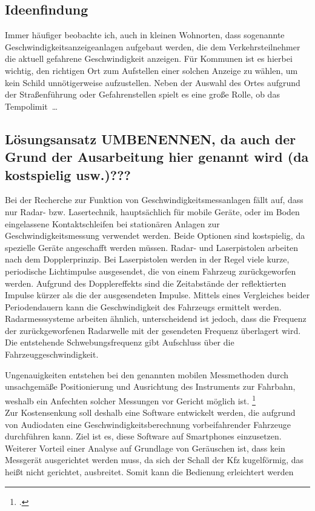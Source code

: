 \subsection{Ideenfindung}
Immer häufiger beobachte ich, auch in kleinen Wohnorten, dass sogenannte Geschwindigkeitsanzeigeanlagen aufgebaut werden, die dem Verkehrsteilnehmer die aktuell gefahrene Geschwindigkeit anzeigen.
Für Kommunen ist es hierbei wichtig, den richtigen Ort zum Aufstellen einer solchen Anzeige zu wählen, um kein Schild unnötigerweise aufzustellen. Neben der Auswahl des Ortes aufgrund der Straßenführung oder Gefahrenstellen spielt es eine große Rolle, ob das Tempolimit \dots

\subsection{Lösungsansatz \textbf{UMBENENNEN, da auch der Grund der Ausarbeitung hier genannt wird (da kostspielig usw.)???}} %
Bei der Recherche zur Funktion von Geschwindigkeitsmessanlagen fällt auf, dass nur Radar- bzw. Lasertechnik, hauptsächlich für mobile Geräte, oder im Boden eingelassene Kontaktschleifen bei stationären Anlagen zur Geschwindigkeitsmessung verwendet werden. Beide Optionen sind kostspielig, da spezielle Geräte angeschafft werden müssen. Radar- und Laserpistolen arbeiten nach dem Dopplerprinzip. Bei Laserpistolen werden in der Regel viele kurze, periodische Lichtimpulse ausgesendet, die von einem Fahrzeug zurückgeworfen werden. Aufgrund des Dopplereffekts sind die Zeitabstände der reflektierten Impulse kürzer als die der ausgesendeten Impulse. Mittels eines Vergleiches beider Periodendauern kann die Geschwindigkeit des Fahrzeugs ermittelt werden. Radarmesssysteme arbeiten ähnlich, unterscheidend ist jedoch, dass die Frequenz der zurückgeworfenen Radarwelle mit der gesendeten Frequenz überlagert wird. Die entstehende Schwebungsfrequenz gibt Aufschluss über die Fahrzeuggeschwindigkeit.

Ungenauigkeiten entstehen bei den genannten mobilen Messmethoden durch unsachgemäße Positionierung und Ausrichtung des Instruments zur Fahrbahn, weshalb ein Anfechten solcher Messungen vor Gericht möglich ist. \footcite{AnfechtenMobileMessmethoden}\\

Zur Kostensenkung soll deshalb eine Software entwickelt werden, die aufgrund von Audiodaten eine Geschwindigkeitsberechnung vorbeifahrender Fahrzeuge durchführen kann. Ziel ist es, diese Software auf Smartphones einzusetzen. Weiterer Vorteil einer Analyse auf Grundlage von Geräuschen ist, dass kein Messgerät ausgerichtet werden muss, da sich der Schall der Kfz kugelförmig, das heißt nicht gerichtet, ausbreitet. Somit kann die Bedienung erleichtert werden %